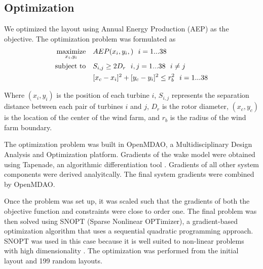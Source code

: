 \documentclass[conf]{new-aiaa}
\begin{document}



\subsection{Optimization}

We optimized the layout using Annual Energy Production (AEP) as the objective. The optimization problem was formulated as
%
\begin{equation}
	\label{e:objective}
	\begin{aligned} [b]
	\underset{x_i,y_i}{\textrm{maximize}} \quad & AEP(x_i,y_i,)~~i=1...38\\
	\textrm{subject to} \quad & S_{i,j} \geq 2\*D_{r}~~i,j=1...38~~i \neq j\\
	 & [x_c-x_i]^2+[y_c-y_i]^2 \leq r_{b}^2~~i=1...38\\
	\end{aligned}
\end{equation}
%
Where $(x_i,y_i)$ is the position of each turbine $i$, $S_{i,j}$ represents the separation distance between each pair of turbines $i$ and $j$, $D_{r}$ is the rotor diameter, $(x_c,y_c)$ is the location of the center of the wind farm, and $r_b$ is the radius of the wind farm boundary.

The optimization problem was built in OpenMDAO, a Multidisciplinary Design Analysis and Optimization platform. Gradients of the wake model were obtained using Tapenade, an algorithmic differentiation tool \cite{tapenade2013}. Gradients of all other system components were derived analyitcally. The final system gradients were combined by OpenMDAO.

Once the problem was set up, it was scaled such that the gradients of both the objective function and constraints were close to order one. The final problem was then solved using SNOPT (Sparse Nonlinear OPTimizer), a gradient-based optimization algorithm that uses a sequential quadratic programming approach.  SNOPT was used in this case because it is well suited to non-linear problems with high dimensionality \cite{gill2005}. The optimization was performed from the initial layout and 199 random layouts.  

\end{document}
